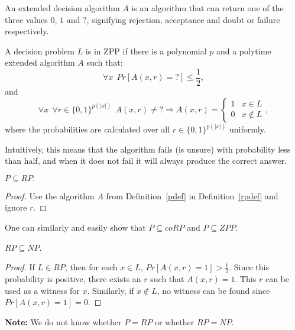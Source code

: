 \begin{definition}
An extended decision algorithm $A$ is an algorithm that can return one of the three values $0$, $1$ and $?$, signifying rejection, acceptance and doubt or failure respectively.
\end{definition}

\begin{definition}\label{zppdef}
A decision problem $L$ is in ZPP if there is a polynomial $p$ and a polytime extended algorithm $A$ such that:
$$\forall x ~~ Pr[A(x, r) = ?] \leq \frac{1}{2},$$ and
$$\forall x ~~ \forall r \in \{0, 1\}^{p(\vert x \vert)}  ~~ A(x, r)\neq ? \Rightarrow A(x, r) = \left\{\begin{matrix}
1 & x \in L\\ 
0 & x \not \in L
\end{matrix}\right.,$$
where the probabilities are calculated over all $r \in \{0, 1\}^{p(\vert x \vert)}$ uniformly.

Intuitively, this means that the algorithm fails (is unsure) with probability less than half, and when it does not fail it will always produce the correct answer.
\end{definition}

\begin{proposition}
$P \subseteq RP.$
\end{proposition}
\begin{proof}
Use the algorithm $A$ from Definition~\ref{pdef} in Definition~\ref{rpdef} and ignore $r$. 
\end{proof}

One can similarly and easily show that $P \subseteq coRP$ and $P \subseteq ZPP$.

\begin{proposition}
$RP \subseteq NP$.
\end{proposition}
\begin{proof}
If $L \in RP$, then for each $x \in L$, $Pr[A(x, r) = 1] > \frac{1}{2}$. Since this probability is positive, there exists an $r$ such that $A(x, r) = 1$. This $r$ can be used as a witness for $x$. Similarly, if $x \not \in L$, no witness can be found since $Pr[A(x, r) = 1] = 0$.
\end{proof}

\textbf{Note:} We do not know whether $P=RP$ or whether $RP=NP$. 

